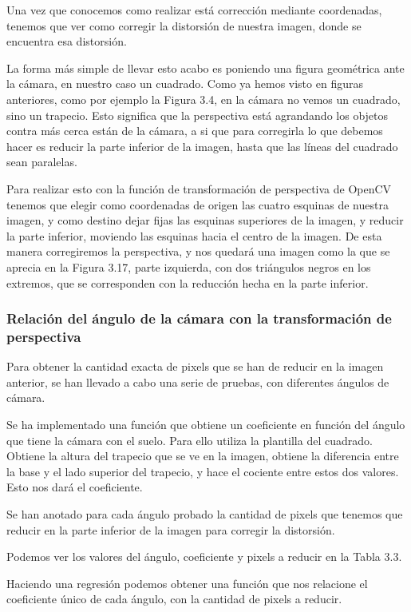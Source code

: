 Una vez que conocemos como realizar está corrección mediante coordenadas, tenemos que ver como corregir la distorsión de nuestra imagen, donde se encuentra esa distorsión.

La forma más simple de llevar esto acabo es poniendo una figura geométrica ante la cámara, en nuestro caso un cuadrado. Como ya hemos visto en figuras anteriores, como por ejemplo la Figura 3.4, en la cámara no vemos un cuadrado, sino un trapecio. Esto significa que la perspectiva está agrandando los objetos contra más cerca están de la cámara, a si que para corregirla lo que debemos hacer es reducir la parte inferior de la imagen, hasta que las líneas del cuadrado sean paralelas.

Para realizar esto con la función de transformación de perspectiva de OpenCV tenemos que elegir como coordenadas de origen las cuatro esquinas de nuestra imagen, y como destino dejar fijas las esquinas superiores de la imagen, y reducir la parte inferior, moviendo las esquinas hacia el centro de la imagen\cite{coord_persp}. De esta manera corregiremos la perspectiva, y nos quedará una imagen como la que se aprecia en la Figura 3.17, parte izquierda, con dos triángulos negros en los extremos, que se corresponden con la reducción hecha en la parte inferior. 

\subsubsection{Relación del ángulo de la cámara con la transformación de perspectiva}

Para obtener la cantidad exacta de pixels que se han de reducir en la imagen anterior, se han llevado a cabo una serie de pruebas, con diferentes ángulos de cámara.

Se ha implementado una función que obtiene un coeficiente en función del ángulo que tiene la cámara con el suelo. Para ello utiliza la plantilla del cuadrado. Obtiene la altura del trapecio que se ve en la imagen, obtiene la diferencia entre la base y el lado superior del trapecio, y hace el cociente entre estos dos valores. Esto nos dará el coeficiente.

Se han anotado para cada ángulo probado la cantidad de pixels que tenemos que reducir en la parte inferior de la imagen para corregir la distorsión.

Podemos ver los valores del ángulo, coeficiente y pixels a reducir en la Tabla 3.3.

Haciendo una regresión podemos obtener una función que nos relacione el coeficiente único de cada ángulo, con la cantidad de pixels a reducir.

